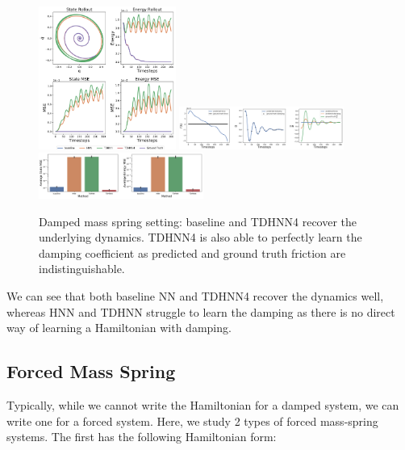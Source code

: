 \documentclass[twoside]{article}
\begin{document}
\begin{figure}[h!]
\centering
\includegraphics[width=0.4\textwidth]{figures/damped_1_pred.pdf}
\includegraphics[width=0.48\textwidth]{figures/dpdt_damped.pdf}
\includegraphics[width=0.48\textwidth]{figures/damped_1_errors.pdf}
\caption{Damped mass spring setting: baseline and TDHNN4 recover the underlying dynamics. TDHNN4 is also able to perfectly learn the damping coefficient as predicted and ground truth friction are indistinguishable.}
\label{damped}
\end{figure}

We can see that both baseline NN and TDHNN4 recover the dynamics well, whereas HNN and TDHNN struggle to learn the damping as there is no direct way of learning a Hamiltonian with damping.

\subsection{Forced Mass Spring}

Typically, while we cannot write the Hamiltonian for a damped system, we can write one for a forced system. Here, we study 2 types of forced mass-spring systems. The first has the following Hamiltonian form:
\end{document}
